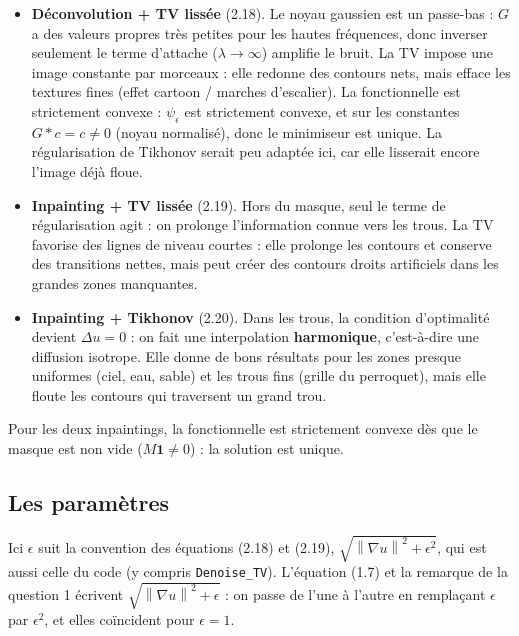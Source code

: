 \documentclass[11pt,a4paper]{article}
\newcommand{\nr}[1]{\left\| #1 \right\|}
\begin{document}
\begin{itemize}[leftmargin=*]
  \item \textbf{Déconvolution + TV lissée} (2.18).
    Le noyau gaussien est un passe-bas : $G$ a des valeurs propres très petites pour les hautes fréquences,
    donc inverser seulement le terme d'attache ($\lambda\to\infty$) amplifie le bruit.
    La TV impose une image constante par morceaux : elle redonne des contours nets, mais
    efface les textures fines (effet \og cartoon \fg{} / marches d'escalier).
    La fonctionnelle est strictement convexe : $\psi_\epsilon$ est strictement convexe, et sur les constantes
    $G * c = c \neq 0$ (noyau normalisé), donc le minimiseur est unique.
    La régularisation de Tikhonov serait peu adaptée ici, car elle lisserait encore l'image déjà floue.

  \item \textbf{Inpainting + TV lissée} (2.19).
    Hors du masque, seul le terme de régularisation agit : on prolonge l'information connue vers les trous.
    La TV favorise des lignes de niveau courtes : elle prolonge les contours et conserve des transitions nettes,
    mais peut créer des contours droits artificiels dans les grandes zones manquantes.

  \item \textbf{Inpainting + Tikhonov} (2.20).
    Dans les trous, la condition d'optimalité devient $\Delta u = 0$ : on fait une interpolation
    \textbf{harmonique}, c'est-à-dire une diffusion isotrope. Elle donne de bons résultats pour les zones presque
    uniformes (ciel, eau, sable) et les trous fins (grille du perroquet), mais elle floute les contours qui
    traversent un grand trou.
\end{itemize}

Pour les deux inpaintings, la fonctionnelle est strictement convexe dès que le masque est non vide
($M\mathbf 1 \neq 0$) : la solution est unique.

\subsection*{Les paramètres}

Ici $\epsilon$ suit la convention des équations (2.18) et (2.19), $\sqrt{\nr{\nabla u}^2+\epsilon^2}$, qui est aussi celle du
code (y compris \texttt{Denoise\_TV}). L'équation (1.7) et la remarque de la question 1 écrivent $\sqrt{\nr{\nabla u}^2+\epsilon}$ :
on passe de l'une à l'autre en remplaçant $\epsilon$ par $\epsilon^2$, et elles coïncident pour $\epsilon=1$.
\end{document}
